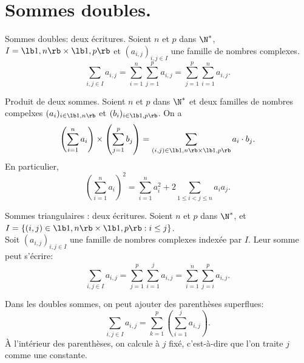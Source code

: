 \documentclass[11pt]{article}
\begin{document}
\section{Sommes doubles.}

\begin{thm}{Sommes doubles: deux écritures.}{}
    Soient $n$ et $p$ dans $\N^*$, $I=\lb1,n\rb\times\lb1,p\rb$ et $(a_{i,j})_{i,j\in I}$ une famille de nombres complexes.
    \begin{equation*}
        \sum_{i,j\in I}a_{i,j}=\sum_{i=1}^n\sum_{j=1}^pa_{i,j}=\sum_{j=1}^p\sum_{i=1}^na_{i,j}.
    \end{equation*}
\end{thm}

\begin{prop}{Produit de deux sommes.}{}
    Soient $n$ et $p$ dans $\N^*$ et deux familles de nombres compelxes $(a_i)_{i\in\lb1,n\rb}$ et $(b_i)_{i\in\lb1,p\rb}$. On a
    \begin{equation*}
        \left( \sum_{i=1}^na_i \right) \times \left( \sum_{j=1}^pb_j \right) = \sum_{(i,j)\in\lb1,n\rb\times\lb1,p\rb}a_i\cdot b_j.
    \end{equation*}
    En particulier,
    \begin{equation*}
        \left( \sum_{i=1}^na_i \right)^2=\sum_{i=1}^na_i^2+2\sum_{1\leq i<j\leq n}a_ia_j.
    \end{equation*}
\end{prop}

\begin{prop}{Sommes triangulaires : deux écritures.}{}
    Soient $n$ et $p$ dans $\N^*$, et $I=\{(i,j)\in\lb1,n\rb\times\lb1,p\rb:i\leq j\}$.\\
    Soit $(a_{i,j})_{i,j\in I}$ une famille de nombres complexes indexée par $I$. Leur somme peut s'écrire:
    \begin{equation*}
        \sum_{i,j\in I}a_{i,j}=\sum_{j=1}^p\sum_{i=1}^ja_{i,j}=\sum_{i=1}^n\sum_{j=i}^pa_{i,j}.
    \end{equation*}
\end{prop}

\begin{meth}{}{}
    Dans les doubles sommes, on peut ajouter des parenthèses superflues:
    \begin{equation*}
        \sum_{i,j\in I}a_{i,j}=\sum_{k=1}^p\left( \sum_{i=1}^ja_{i,j} \right).
    \end{equation*}
    À l'intérieur des parenthèses, on calcule à $j$ fixé, c'est-à-dire que l'on traite $j$ comme une constante.
\end{meth}
\end{document}
